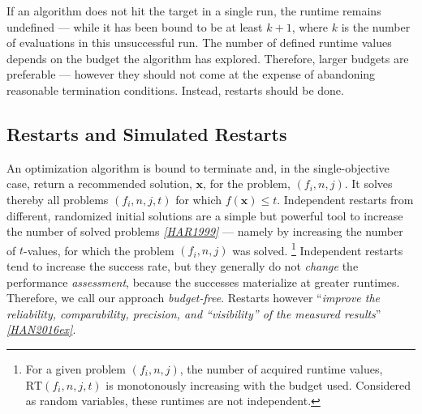 \documentclass[letterpaper,12pt,english]{article}
\newcommand{\ve}[1]{{\boldsymbol{#1}}}
\newcommand{\x}{\ensuremath{\ve{x}}}
\begin{document}
If an algorithm does not hit the target in a single run, the runtime remains
undefined --- while
it has been bound to be at least \(k+1\), where \(k\) is the number of
evaluations in this unsuccessful run.
The number of defined runtime values depends on the budget the
algorithm has explored.
Therefore, larger budgets are preferable --- however they should not come at
the expense of abandoning reasonable termination conditions. Instead,
restarts should be done.


\subsection{Restarts and Simulated Restarts}
\label{index:restarts-and-simulated-restarts}\label{index:sec-restarts}
An optimization algorithm is bound to terminate and, in the single-objective case, return a recommended
solution, \(\x\), for the problem, \((f_i, n, j)\).
It solves thereby all problems \((f_i, n, j, t)\) for which \(f(\x)\le t\).
Independent restarts from different, randomized initial solutions are a simple
but powerful tool to increase the number of solved problems \label{index:id37}{\hyperref[index:har1999]{\emph{{[}HAR1999{]}}}} --- namely by increasing the number of \(t\)-values, for which the problem \((f_i, n, j)\)
was solved. \footnote[12]{
For a given problem \((f_i, n, j)\), the number of acquired runtime values, \(\mathrm{RT}(f_i, n, j, t)\)
is monotonously increasing with the budget used. Considered as random
variables, these runtimes are not independent.
}
Independent restarts tend to increase the success rate, but they generally do
not \emph{change} the performance \emph{assessment}, because the successes materialize at
greater runtimes.
Therefore, we call our approach \emph{budget-free}.
Restarts however ``\emph{improve the reliability, comparability, precision, and ``visibility'' of the measured results}'' \label{index:id39}{\hyperref[index:han2016ex]{\emph{{[}HAN2016ex{]}}}}.
\end{document}
